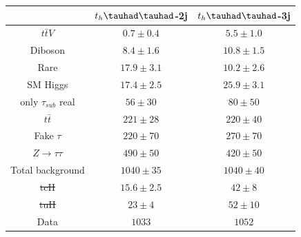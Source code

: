 \documentclass[PAPER, coverpage, atlasdraft=true, texlive=2016, UKenglish]{\ATLASLATEXPATH atlasdoc}
\providecommand{\DIFadd}[1]{{\protect\color{blue}\uwave{#1}}} %
\providecommand{\DIFdel}[1]{{\protect\color{red}\sout{#1}}}                      %
\providecommand{\DIFaddFL}[1]{\DIFadd{#1}} %
\providecommand{\DIFdelFL}[1]{\DIFdel{#1}} %
\providecommand{\DIFaddbeginFL}{} %
\providecommand{\DIFaddendFL}{} %
\providecommand{\DIFdelbeginFL}{} %
\providecommand{\DIFdelendFL}{} %
\begin{document}
\begin{table}[htbp]
\begin{tabular}{ccc} \toprule\toprule
& $t_{h}\thadhad$-2j & $t_{h}\thadhad$-3j\\\midrule
  $t\bar{t}V$              & \DIFaddbeginFL \DIFaddFL{~~}\DIFaddendFL $0.7 \pm 0.4 $ & \DIFaddbeginFL \DIFaddFL{~~}\DIFaddendFL $5.5 \pm 1.0 $  \\
  Diboson                  & \DIFaddbeginFL \DIFaddFL{~~}\DIFaddendFL $8.4 \pm 1.6 $ & $10.8 \pm 1.5$  \\
  Rare                     & $17.9 \pm 3.1$ & $10.2 \pm 2.6$  \\ 
  SM Higgs                 & $17.4 \pm 2.5$ & $25.9 \pm 3.1$  \\ 
  only \DIFdelbeginFL \DIFdelFL{$\tau_{sub}$ }\DIFdelendFL \DIFaddbeginFL \DIFaddFL{$\tau_\text{sub}$ }\DIFaddendFL real   & \DIFaddbeginFL \DIFaddFL{~~}\DIFaddendFL $56 \pm 30   $ & \DIFaddbeginFL \DIFaddFL{~~}\DIFaddendFL $80 \pm 50   $  \\  
  $t\bar{t}$               & $221 \pm 28  $ & $220 \pm 40  $  \\
  Fake $\tau$              & $220 \pm 70  $ & $270 \pm 70  $  \\  
  $Z\rightarrow\tau\tau$   & $490 \pm 50  $ & $420 \pm 50  $  \\ \midrule
  Total background         & $1040 \pm 35 $\DIFaddbeginFL \DIFaddFL{~~ }\DIFaddendFL & $1040 \pm 40 $\DIFaddbeginFL \DIFaddFL{~~  }\DIFaddendFL \\ \midrule
  \DIFdelbeginFL \DIFdelFL{tcH                      }\DIFdelendFL \DIFaddbeginFL \DIFaddFL{$tcH$                      }\DIFaddendFL & $15.6 \pm 2.5$ & $42 \pm 8    $  \\ 
  \DIFdelbeginFL \DIFdelFL{tuH                      }\DIFdelendFL \DIFaddbeginFL \DIFaddFL{$tuH$                      }\DIFaddendFL & $23 \pm 4    $ & \DIFaddbeginFL \DIFaddFL{~~}\DIFaddendFL $52 \pm 10   $  \\ \midrule
  Data                     & $1033       $& $1052 $       \\
\bottomrule\bottomrule
\end{tabular}
\label{tab:HtautauPostfitYieldsUnblind}
\end{table}
\end{document}

